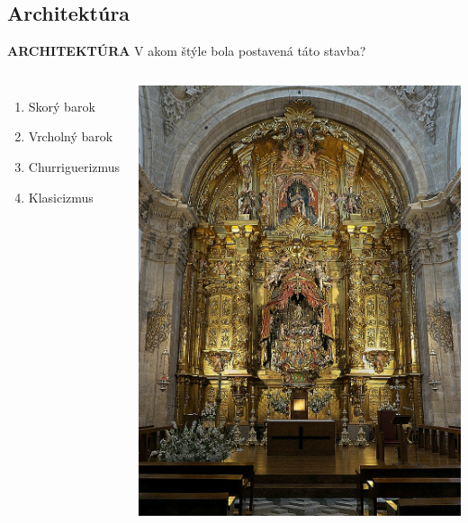 \documentclass[dvipsnames]{beamer}
\begin{document}
\begin{frame}
	\subsection{Architektúra}
	\textbf{ARCHITEKTÚRA}
	\vskip 3mm
	V akom štýle bola postavená táto stavba?
	\begin{columns}
	\begin{enumerate}
		\item Skorý barok
		\item Vrcholný barok
		\item Churriguerizmus
		\item Klasicizmus
	\end{enumerate}
		\includegraphics[scale=0.2]{ultra}

	\end{columns}
\end{frame}
\end{document}
